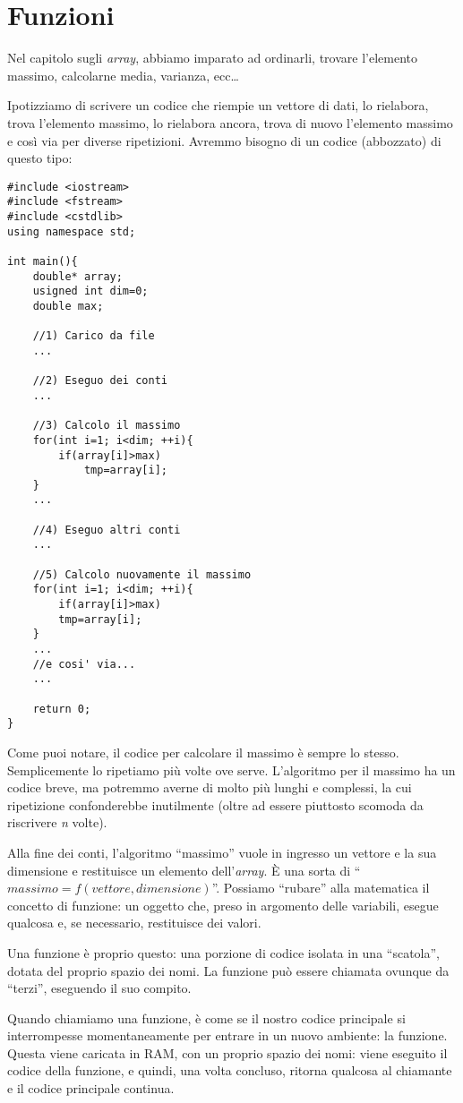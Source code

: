 \chapter{Funzioni}\label{funzioni}
Nel capitolo sugli \emph{array}, abbiamo imparato ad ordinarli, trovare l'elemento massimo, calcolarne media, varianza, ecc\ldots

Ipotizziamo di scrivere un codice che riempie un vettore di dati, lo rielabora, trova l'elemento massimo, lo rielabora ancora, trova di nuovo l'elemento massimo e così via per diverse ripetizioni. Avremmo bisogno di un codice (abbozzato) di questo tipo:

\begin{lstlisting}
#include <iostream>
#include <fstream>
#include <cstdlib>
using namespace std;

int main(){
	double* array;
	usigned int dim=0;
	double max;
	
	//1) Carico da file
	...
	
	//2) Eseguo dei conti
	...
	
	//3) Calcolo il massimo
	for(int i=1; i<dim; ++i){
		if(array[i]>max)
			tmp=array[i];	
	}
	...
	
	//4) Eseguo altri conti
	...
	
	//5) Calcolo nuovamente il massimo
	for(int i=1; i<dim; ++i){
		if(array[i]>max)
		tmp=array[i];	
	}
	...
	//e cosi' via...
	...
	
	return 0;	
}
\end{lstlisting}

Come puoi notare, il codice per calcolare il massimo è sempre lo stesso. Semplicemente lo ripetiamo più volte ove serve. L'algoritmo per il massimo ha un codice breve, ma potremmo averne di molto più lunghi e complessi, la cui ripetizione confonderebbe inutilmente (oltre ad essere piuttosto scomoda da riscrivere \emph{n} volte).

Alla fine dei conti, l'algoritmo ``massimo'' vuole in ingresso un vettore e la sua dimensione e restituisce un elemento dell'\emph{array}. È una sorta di ``$massimo= f(vettore, dimensione)$''. Possiamo ``rubare'' alla matematica il concetto di funzione: un oggetto che, preso in argomento delle variabili, esegue qualcosa e, se necessario,  restituisce dei valori.

Una funzione è proprio questo: una porzione di codice isolata in una ``scatola'', dotata del proprio spazio dei nomi. La funzione può essere chiamata ovunque da ``terzi'', eseguendo il suo compito. 

Quando chiamiamo una funzione, è come se il nostro codice principale si interrompesse momentaneamente per entrare in un nuovo ambiente: la funzione. Questa viene caricata in RAM, con un proprio spazio dei nomi: viene eseguito il codice della funzione, e quindi, una volta concluso, ritorna qualcosa al chiamante e il codice principale continua. \\

